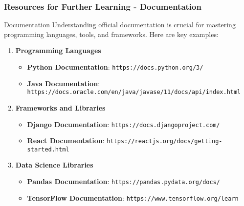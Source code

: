 \documentclass[aspectratio=169]{beamer}
\begin{document}
\begin{frame}[fragile]
  \frametitle{Resources for Further Learning - Documentation}
  \begin{block}{Documentation}
    Understanding official documentation is crucial for mastering programming languages, tools, and frameworks. Here are key examples:
  \end{block}
  
  \begin{enumerate}
    \item \textbf{Programming Languages}
      \begin{itemize}
        \item \textbf{Python Documentation}: \texttt{https://docs.python.org/3/}
        \item \textbf{Java Documentation}: \texttt{https://docs.oracle.com/en/java/javase/11/docs/api/index.html}
      \end{itemize}
    
    \item \textbf{Frameworks and Libraries}
      \begin{itemize}
        \item \textbf{Django Documentation}: \texttt{https://docs.djangoproject.com/}
        \item \textbf{React Documentation}: \texttt{https://reactjs.org/docs/getting-started.html}
      \end{itemize}
    
    \item \textbf{Data Science Libraries}
      \begin{itemize}
        \item \textbf{Pandas Documentation}: \texttt{https://pandas.pydata.org/docs/}
        \item \textbf{TensorFlow Documentation}: \texttt{https://www.tensorflow.org/learn}
      \end{itemize}
  \end{enumerate}
\end{frame}
\end{document}
